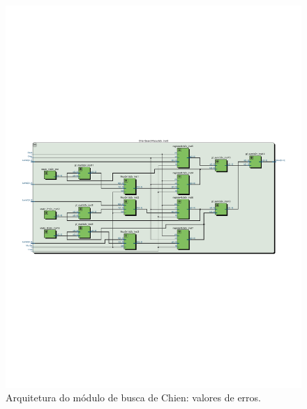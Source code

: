 \begin{figure}[h]
	\caption{\label{fig_chienval_arq}Arquitetura do módulo de busca de Chien: valores de erros.}
	\centering
		\includegraphics[width=1.0\textwidth, trim={0 8cm 0 9cm}, clip]{RS/ChienValueRTL.pdf}
\end{figure}

